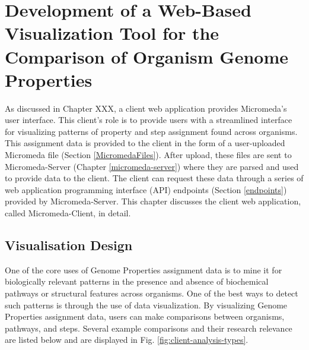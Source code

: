 \chapter{Development of a Web-Based Visualization Tool for the Comparison of Organism Genome Properties} \label{micromeda-client}

As discussed in Chapter XXX, a client web application provides Micromeda's user interface. This client's role is to provide users with a streamlined interface for visualizing patterns of property and step assignment found across organisms. This assignment data is provided to the client in the form of a user-uploaded Micromeda file (Section \ref{MicromedaFiles}). After upload, these files are sent to Micromeda-Server (Chapter \ref{micromeda-server}) where they are parsed and used to provide data to the client. The client can request these data through a series of web application programming interface (API) endpoints (Section \ref{endpoints}) provided by Micromeda-Server. This chapter discusses the client web application, called Micromeda-Client, in detail.

\section{Visualisation Design} \label{visualization-design}

One of the core uses of Genome Properties assignment data is to mine it for biologically relevant patterns in the presence and absence of biochemical pathways or structural features across organisms. One of the best ways to detect such patterns is through the use of data visualization. By visualizing Genome Properties assignment data, users can make comparisons between organisms, pathways, and steps. Several example comparisons and their research relevance are listed below and are displayed in Fig. \ref{fig:client-analysis-types}. 

